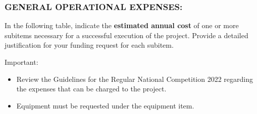 \documentclass[MAIN.tex]{subfiles}
\begin{document}
\newpage

\subsubsection*{\uppercase{General operational expenses:}}

In the following table, indicate the \textbf{estimated annual cost} of one or more subitems necessary for a successful execution of the project. Provide a detailed justification for your funding request for each subitem.

\medskip

\noindent Important:
\begin{itemize}[nosep]
\item Review the Guidelines for the Regular National Competition 2022 regarding the expenses that can be charged to the project.
\item Equipment must be requested under the equipment item.
\end{itemize}
\end{document}
